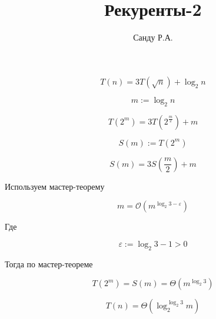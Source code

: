 \documentclass[11pt]{article}
\title{Рекуренты-2}
\author{Санду Р.А.}
\begin{document}
\maketitle

\[
	T\left(n\right)=3T\left(\sqrt{n}\right)+\log_2{n}
\]

\[
	m := \log_2{n}
\]

\[
	T\left(2^m\right) = 3T\left(2^\frac{m}{2}\right) + m
\]

\[
	S\left(m\right) := T\left(2^m\right)
\]

\[
	S\left(m\right) = 3S\left(\frac{m}{2}\right) + m
\]

Используем мастер-теорему

\[
	m = \mathcal{O}\left(m^{\log_2{3}-\varepsilon}\right)
\]

Где

\[
	\varepsilon := \log_2{3}-1 > 0
\]

Тогда по мастер-теореме

\[
	T\left(2^m\right) = S\left(m\right) = \Theta\left(m^{\log_2{3}}\right)
\]

\[
	T\left(n\right) = \Theta\left(\log_{2}^{\log_2{3}}{m}\right)
\]
\end{document}
